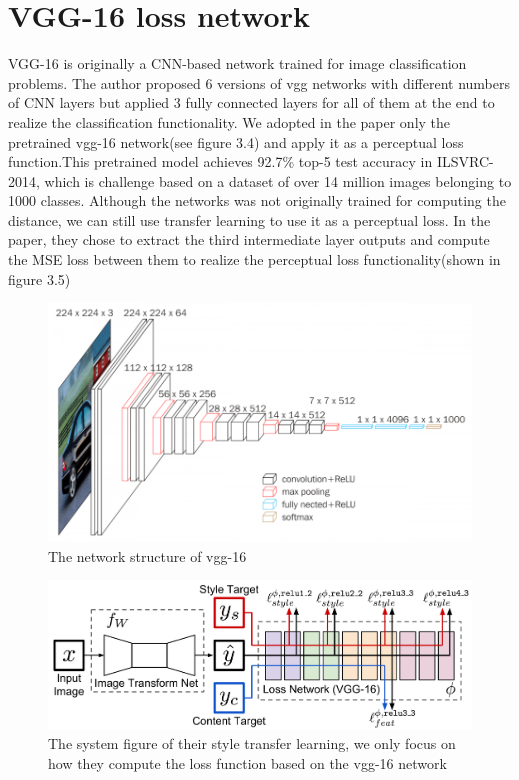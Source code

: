 \documentclass[a4paper,12pt,twoside]{report}
\begin{document}
\section{VGG-16 loss network}

VGG-16\cite{simonyan2014very} is originally a CNN-based network trained for image classification problems. The author proposed 6 versions of vgg networks with different numbers of CNN layers but applied 3 fully connected layers for all of them at the end to realize the classification functionality. We adopted in the paper only the pretrained vgg-16 network(see figure 3.4) and apply it as a perceptual loss function.This pretrained model achieves 92.7\% top-5 test accuracy in ILSVRC-2014, which is challenge based on a dataset of over 14 million images belonging to 1000 classes. Although the networks was not originally trained for computing the distance, we can still use transfer learning to use it as a perceptual loss. In the paper\cite{johnson2016perceptual}, they chose to extract the third intermediate layer outputs and compute the MSE loss between them to realize the perceptual loss functionality(shown in figure 3.5)
\begin{figure}
\centering
\includegraphics[width=1.0\textwidth]{vgg16.png}
\caption{The network structure of vgg-16}
\end{figure}
\begin{figure}
\centering
\includegraphics[width=1.0\textwidth]{SystemFigure.pdf}
\caption{The system figure of their style transfer learning, we only focus on how they compute the loss function based on the vgg-16 network}
\end{figure}
\end{document}
